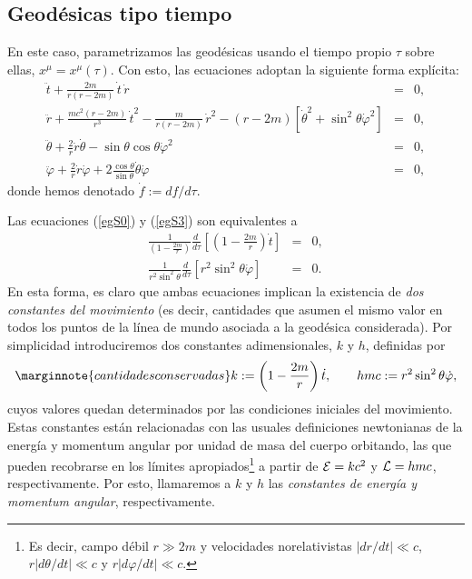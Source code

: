 \subsection{Geodésicas tipo tiempo}
En este caso, parametrizamos las geodésicas usando el tiempo propio $\tau$ sobre ellas, $x^\mu=x^\mu(\tau)$. Con esto, las ecuaciones adoptan la siguiente forma explícita:
\begin{eqnarray}
\ddot{t}+\frac{2m}{r(r-2m) }\,\dot{t}\,\dot{r}&=&0, \label{egS0}\\
\ddot{r}+\frac{mc^2(r-2m)}{r^3}\,\dot{t}^2-\frac{m}{r\left(
r-2m\right) }\,\dot{r}^2-(r-2m) \left[ \dot{\theta}^2+\sin
^2\theta \dot{\varphi}^2\right] &=&0, \label{egS1}\\
\ddot{\theta}+\frac{2}{r}\dot{r}\dot{\theta}-\sin \theta \cos \theta
\dot{\varphi}^2 &=&0, \label{egS2}\\
\ddot{\varphi}+\frac2{r}\dot{r}\dot{\varphi}+2\frac{\cos\theta}{\sin\theta}
\dot{\theta}\dot{\varphi}&=&0,\label{egS3}
\end{eqnarray}%
donde hemos denotado $\dot{f}:={df}/{d\tau}$.

Las ecuaciones (\ref{egS0}) y (\ref{egS3}) son equivalentes a
\begin{eqnarray}
\frac{1}{\left(1-\frac{2m}{r}\right)} \frac{d\ }{d\tau}\left[\left(1-\frac{2m}{r}\right)\dot{t}\right]&=&0,\\
\frac{1}{r^2\sin^2\theta} \frac{d\ }{d\tau}\left[r^2\sin^2\theta\dot{\varphi}\right]&=&0.
\end{eqnarray}
En esta forma, es claro que ambas ecuaciones implican la existencia de \textit{dos constantes del movimiento} (es decir, cantidades que asumen el mismo valor en todos los puntos de la línea de mundo asociada a la geodésica considerada). Por simplicidad introduciremos dos constantes adimensionales, $k$ y $h$, definidas por
\begin{equation}\marginnote{cantidades conservadas}
 k:=\left(1-\frac{2m}{r}\right)\dot{t}, \qquad hmc:=r^2\sin^2\theta\dot{\varphi},
\label{kh}
\end{equation}
cuyos valores quedan determinados por las condiciones iniciales del movimiento.
Estas constantes están relacionadas con las usuales definiciones newtonianas de la energía y momentum angular por unidad de masa del cuerpo orbitando, las que pueden recobrarse en los límites apropiados\footnote{Es decir, campo débil $r\gg 2m$ y velocidades norelativistas $|dr/dt|\ll c$, $r|d\theta/dt|\ll c$ y $r|d\varphi/dt|\ll c$.} a partir de ${\cal E}=kc^2$ y ${\cal L}=hmc$, respectivamente. Por esto, llamaremos a $k$ y $h$ las \textit{constantes de energía y momentum angular}, respectivamente.

